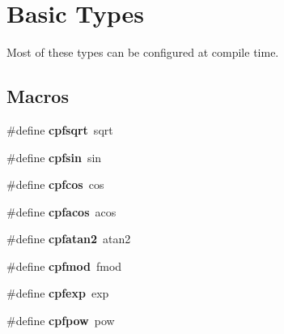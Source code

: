 \hypertarget{group__basic_types}{}\section{Basic Types}
\label{group__basic_types}


Most of these types can be configured at compile time.  


\subsection*{Macros}
\begin{DoxyCompactItemize}
\item 
\hypertarget{group__basic_types_gad6a505ab629d04f2722b5bd02b080289}{}\#define {\bfseries cpfsqrt}~sqrt\label{group__basic_types_gad6a505ab629d04f2722b5bd02b080289}

\item 
\hypertarget{group__basic_types_ga91ad262063f562fe882c686038ade622}{}\#define {\bfseries cpfsin}~sin\label{group__basic_types_ga91ad262063f562fe882c686038ade622}

\item 
\hypertarget{group__basic_types_gab24e29862e14b71d2cdd60d5ecf6dfb7}{}\#define {\bfseries cpfcos}~cos\label{group__basic_types_gab24e29862e14b71d2cdd60d5ecf6dfb7}

\item 
\hypertarget{group__basic_types_gaa8cbcd374f1cf4ed859e1aeff42b1398}{}\#define {\bfseries cpfacos}~acos\label{group__basic_types_gaa8cbcd374f1cf4ed859e1aeff42b1398}

\item 
\hypertarget{group__basic_types_gaeae19031d0e96da4f0f8ca5b0953ffff}{}\#define {\bfseries cpfatan2}~atan2\label{group__basic_types_gaeae19031d0e96da4f0f8ca5b0953ffff}

\item 
\hypertarget{group__basic_types_ga6874b96e60ba5336fd1866da8709aaf7}{}\#define {\bfseries cpfmod}~fmod\label{group__basic_types_ga6874b96e60ba5336fd1866da8709aaf7}

\item 
\hypertarget{group__basic_types_gac0b8bda3f5a346ff9479e82f2e1249ab}{}\#define {\bfseries cpfexp}~exp\label{group__basic_types_gac0b8bda3f5a346ff9479e82f2e1249ab}

\item 
\hypertarget{group__basic_types_ga353aa33aa775a59fd98882b1c9e786d1}{}\#define {\bfseries cpfpow}~pow\label{group__basic_types_ga353aa33aa775a59fd98882b1c9e786d1}


\end{DoxyCompactItemize}

